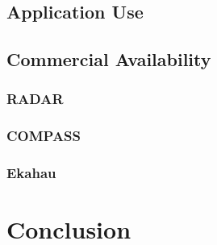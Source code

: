\subsection{Application Use}
\subsection{Commercial Availability}
\subsubsection{RADAR}
\subsubsection{COMPASS}
\subsubsection{Ekahau}
\section{Conclusion}
